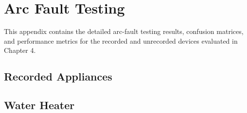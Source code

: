 \chapter{Arc Fault Testing}\label{app:e}
This appendix contains the detailed arc-fault testing results, confusion
matrices, and performance metrics for the recorded and unrecorded
devices evaluated in Chapter 4.

\section*{Recorded Appliances}

\section{Water Heater}\label{appendix-e.1.-arc-fault-test-result-for-water-heater}


